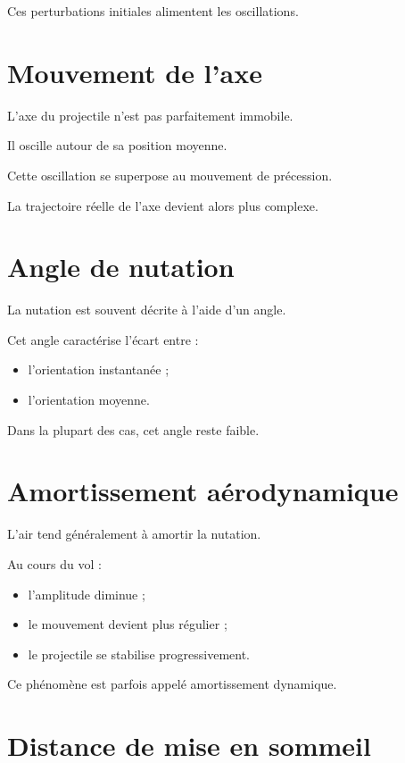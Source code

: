 Ces perturbations initiales alimentent les oscillations.

\section{Mouvement de l'axe}

L'axe du projectile n'est pas parfaitement immobile.

Il oscille autour de sa position moyenne.

Cette oscillation se superpose au mouvement de précession.

La trajectoire réelle de l'axe devient alors plus complexe.

\section{Angle de nutation}

La nutation est souvent décrite à l'aide d'un angle.

Cet angle caractérise l'écart entre :

\begin{itemize}
    \item l'orientation instantanée ;
    \item l'orientation moyenne.
\end{itemize}

Dans la plupart des cas, cet angle reste faible.

\section{Amortissement aérodynamique}

L'air tend généralement à amortir la nutation.

Au cours du vol :

\begin{itemize}
    \item l'amplitude diminue ;
    \item le mouvement devient plus régulier ;
    \item le projectile se stabilise progressivement.
\end{itemize}

Ce phénomène est parfois appelé amortissement dynamique.

\section{Distance de mise en sommeil}

